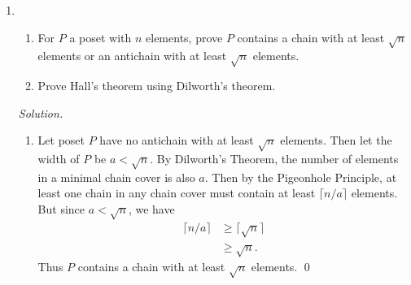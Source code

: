 \documentclass[11pt,letterpaper]{article}
\newenvironment{solution}{\color{blue}\textit{Solution.}}{\color{black}}
\begin{document}
\begin{enumerate}
\begin{solution}
\begin{enumerate}
		For any ideal $I\subseteq{P}$, denote $\tilde{I}$ as the set of maximal elements of $I$. We note that for any pair $x,y\in{\tilde{I}}$, $x$ and $y$ are incomparable, since either $x>y$ or $y>x$ would make one of $x$ and $y$ not maximal. Thus $\tilde{I}$ is an antichain.

		Conversely, let $A$ be an antichain. Define $\tilde{A}$ to be the set where $x\in{\tilde{A}}$ if $x\leq{a}$ for some $a\in{A}$. If $y\leq{x}$, then by transitivity, $y\leq{a}$ for some $a\in{A}$, so $y\in{\tilde{A}}$. This makes $\tilde{A}$ an ideal by definition.
	\end{enumerate}
\end{solution}


\item \begin{enumerate}
\item For $P$ a poset with $n$ elements, prove $P$ contains a chain with at least $\sqrt{n}$ elements or an antichain with at least $\sqrt{n}$ elements.
\item Prove Hall's theorem using Dilworth's theorem.
\end{enumerate}

\begin{solution}
	\begin{enumerate}
		\item Let poset $P$ have no antichain with at least $\sqrt{n}$ elements. Then let the width of $P$ be $a<\sqrt{n}$. By Dilworth's Theorem, the number of elements in a minimal chain cover is also $a$. Then by the Pigeonhole Principle, at least one chain in any chain cover must contain at least $\lceil n/a \rceil$ elements. But since $a<\sqrt{n}$, we have 
		\begin{align*}
			\lceil n/a \rceil &\geq \lceil \sqrt{n} \rceil \\
			&\geq \sqrt{n}.
		\end{align*}
		Thus $P$ contains a chain with at least $\sqrt{n}$ elements. \qed
	\end{enumerate}
\end{solution}


 

\end{enumerate}
\end{document}
